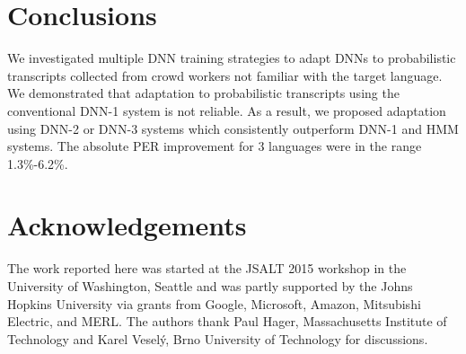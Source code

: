 \documentclass[a4paper]{article}
\begin{document}
\section{Conclusions} \vspace{-1mm}
We investigated multiple DNN training strategies to adapt DNNs to probabilistic transcripts collected from crowd workers not familiar with the target language. We demonstrated that adaptation to probabilistic transcripts using the conventional DNN-1 system is not reliable. As a result, we proposed adaptation using DNN-2 or DNN-3 systems which consistently outperform DNN-1 and HMM systems. The absolute PER improvement for 3 languages were in the range 1.3\%-6.2\%.

\section{Acknowledgements}  \vspace{-1mm}
The work reported here was started at the JSALT 2015 workshop in the University of Washington, Seattle and was partly supported by the Johns Hopkins University via grants from Google, Microsoft, Amazon, Mitsubishi Electric, and MERL. The authors thank Paul Hager, Massachusetts Institute of Technology and Karel Vesel\'y, Brno University of Technology for discussions.


\clearpage
\newpage
\eightpt



\end{document}
